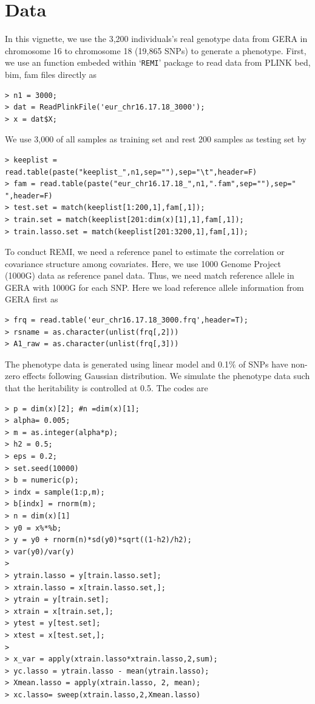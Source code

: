 \documentclass[11pt]{article}
\begin{document}
\section{Data}
\label{datagene}
In this vignette, we use the 3,200 individuals's real genotype data from GERA in chromosome 16 to chromosome 18 (19,865 SNPs) to generate a phenotype. First, we use an function embeded within `\texttt{REMI}' package to read data from PLINK bed, bim, fam files directly as
\begin{verbatim}
> n1 = 3000;
> dat = ReadPlinkFile('eur_chr16.17.18_3000');
> x = dat$X;
\end{verbatim}
We use 3,000 of all samples as training set and rest 200 samples as testing set by
\begin{verbatim}
> keeplist = read.table(paste("keeplist_",n1,sep=""),sep="\t",header=F)
> fam = read.table(paste("eur_chr16.17.18_",n1,".fam",sep=""),sep=" ",header=F)
> test.set = match(keeplist[1:200,1],fam[,1]);
> train.set = match(keeplist[201:dim(x)[1],1],fam[,1]);
> train.lasso.set = match(keeplist[201:3200,1],fam[,1]);
\end{verbatim}
To conduct REMI, we need a reference panel to estimate the correlation or covariance structure among covariates. Here, we use 1000 Genome Project (1000G) data as reference panel data. Thus, we need match reference allele in GERA with 1000G for each SNP. Here we load reference allele information from GERA first as
\begin{verbatim}
> frq = read.table('eur_chr16.17.18_3000.frq',header=T);
> rsname = as.character(unlist(frq[,2]))
> A1_raw = as.character(unlist(frq[,3]))
\end{verbatim}

The phenotype data is generated using linear model and 0.1$\%$ of SNPs have non-zero effects following Gaussian distribution. We simulate the phenotype data such that the heritability is controlled at 0.5. The codes are
\begin{verbatim}
> p = dim(x)[2]; #n =dim(x)[1];
> alpha= 0.005;
> m = as.integer(alpha*p);
> h2 = 0.5;
> eps = 0.2;
> set.seed(10000)
> b = numeric(p);
> indx = sample(1:p,m);
> b[indx] = rnorm(m);
> n = dim(x)[1]
> y0 = x%*%b;
> y = y0 + rnorm(n)*sd(y0)*sqrt((1-h2)/h2);
> var(y0)/var(y)
>
> ytrain.lasso = y[train.lasso.set];
> xtrain.lasso = x[train.lasso.set,];
> ytrain = y[train.set];
> xtrain = x[train.set,];
> ytest = y[test.set];
> xtest = x[test.set,];
>
> x_var = apply(xtrain.lasso*xtrain.lasso,2,sum);
> yc.lasso = ytrain.lasso - mean(ytrain.lasso);
> Xmean.lasso = apply(xtrain.lasso, 2, mean);
> xc.lasso= sweep(xtrain.lasso,2,Xmean.lasso)
\end{verbatim}
\end{document}

